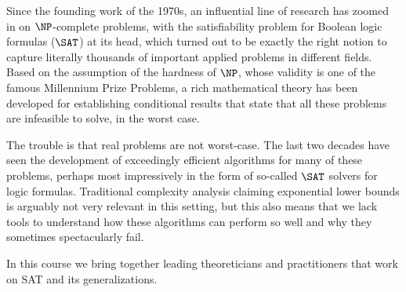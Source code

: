 Since the founding work of the 1970s, an influential line of research has zoomed in on $\NP$-complete
problems, with the satisfiability problem for Boolean logic formulas ($\SAT$) at its head, which turned
out to be exactly the right notion to capture literally thousands of important applied problems in
different fields. Based on the assumption of the hardness of $\NP$, whose validity is one of the famous
Millennium Prize Problems, a rich mathematical theory has been developed for establishing conditional
results that state that all these problems are infeasible to solve, in the worst case. 

The trouble is that real problems are not worst-case. The last two decades have seen the development of
exceedingly efficient algorithms for many of these problems, perhaps most impressively in the form of
so-called $\SAT$ solvers for logic formulas. Traditional complexity analysis claiming exponential lower
bounds is arguably not very relevant in this setting, but this also means that we lack tools to
understand how these algorithms can perform so well and why they sometimes spectacularly fail.

In this course we bring together leading theoreticians and practitioners that work on SAT and its
generalizations.
